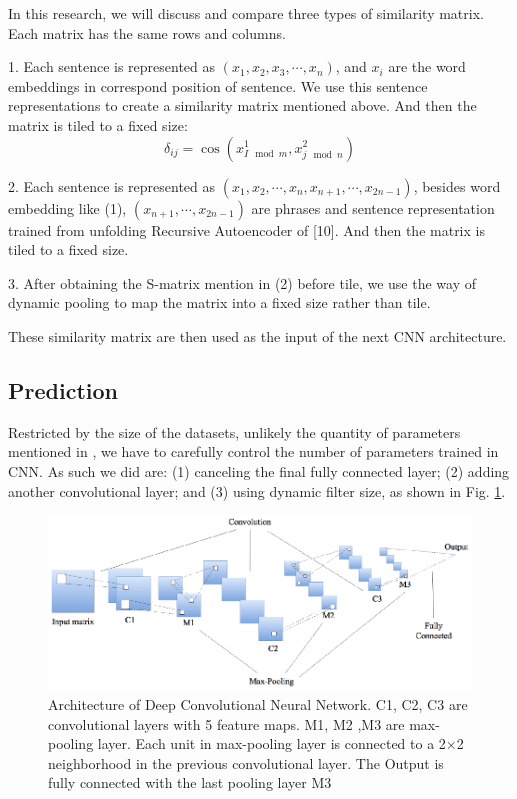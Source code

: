 \documentclass[conference]{IEEEtran}
\begin{document}
In this research, we will discuss and compare three types of similarity matrix. Each matrix has the same rows and columns.

1. Each sentence is represented as $(x_1,x_2,x_3,\cdots,x_n)$, and $x_i$ are the word embeddings in correspond position of sentence. We use this sentence representations to create a similarity matrix mentioned above. And then the matrix is tiled to a fixed size:
\begin{equation}
\delta_{ij}=\cos (x_{I \mod m}^1,x_{j \mod n}^2)
\end{equation}

2. Each sentence is represented as $(x_1,x_2,\cdots,x_n,x_{n+1},\cdots,x_{2n-1})$, besides word embedding like (1), $(x_{n+1},\cdots,x_{2n-1})$ are phrases and sentence representation trained from unfolding Recursive Autoencoder of [10]. And then the matrix is tiled to a fixed size.

3. After obtaining the S-matrix mention in (2) before tile, we use the way of dynamic pooling to map the matrix into a fixed size rather than tile.

These similarity matrix are then used as the input of the next CNN architecture.

\subsection{Prediction}

Restricted by the size of the datasets, unlikely the quantity of parameters mentioned in \cite{DBLP:conf/aaai/ShenRSOX15}, we have to carefully control the number of parameters trained in CNN. As such we did are: (1) canceling the final fully connected layer; (2) adding another convolutional layer; and (3) using dynamic filter size, as shown in Fig. \ref{fig:cnn}.

\begin{figure}
	\centering
	\includegraphics[width=0.9\columnwidth]{figures/Framework}
	\caption{Architecture of Deep Convolutional Neural Network. C1, C2, C3 are convolutional layers with 5 feature maps. M1, M2 ,M3 are max-pooling layer. Each unit in max-pooling layer is connected to a 2×2 neighborhood in the previous convolutional layer. The Output is fully connected with the last pooling layer M3}
	\label{fig:cnn}
\end{figure}
\end{document}
